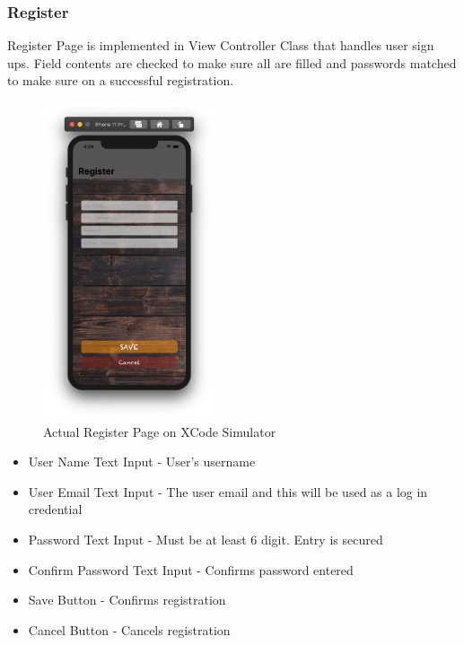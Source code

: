 \documentclass{article}
\begin{document}
    \subsubsection{Register}
        Register Page is implemented in View Controller Class that handles user sign ups.  Field contents are checked to make sure all are filled and passwords matched to make sure on a successful registration.
        \begin{figure}[h]
            \centering
            \includegraphics[width=2in]{images/sim_reg.png}
        \caption{Actual Register Page on XCode Simulator}
        \end{figure}
        \newline
        \begin{itemize}
            \item User Name Text Input - User's username
            \item User Email Text Input - The user email and this will be used as a log in credential
            \item Password Text Input - Must be at least 6 digit.  Entry is secured
            \item Confirm Password Text Input - Confirms password entered
            \item Save Button - Confirms registration
            \item Cancel Button - Cancels registration
        \end{itemize}
        \newpage
\end{document}
